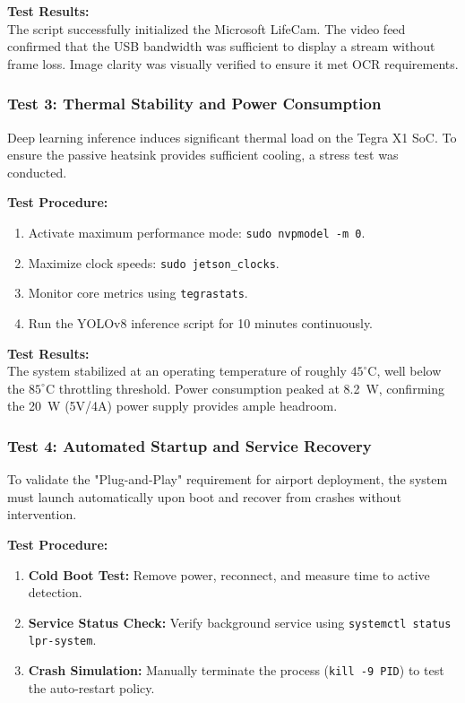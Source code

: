\textbf{Test Results:} \\
The script successfully initialized the Microsoft LifeCam. The video feed confirmed that the USB bandwidth was sufficient to display a stream without frame loss. Image clarity was visually verified to ensure it met OCR requirements.

\subsubsection{Test 3: Thermal Stability and Power Consumption}

Deep learning inference induces significant thermal load on the Tegra X1 SoC. To ensure the passive heatsink provides sufficient cooling, a stress test was conducted.

\textbf{Test Procedure:}
\begin{enumerate}
	\item Activate maximum performance mode: \texttt{sudo nvpmodel -m 0}.
	\item Maximize clock speeds: \texttt{sudo jetson\_clocks}.
	\item Monitor core metrics using \texttt{tegrastats}.
	\item Run the YOLOv8 inference script for 10 minutes continuously.
\end{enumerate}

\textbf{Test Results:} \\
The system stabilized at an operating temperature of roughly $45^\circ$C, well below the $85^\circ$C throttling threshold. Power consumption peaked at \SI{8.2}{\watt}, confirming the \SI{20}{\watt} (5V/4A) power supply provides ample headroom.

\subsubsection{Test 4: Automated Startup and Service Recovery}

To validate the "Plug-and-Play" requirement for airport deployment, the system must launch automatically upon boot and recover from crashes without intervention.

\textbf{Test Procedure:}
\begin{enumerate}
	\item \textbf{Cold Boot Test:} Remove power, reconnect, and measure time to active detection.
	\item \textbf{Service Status Check:} Verify background service using \texttt{systemctl status lpr-system}.
	\item \textbf{Crash Simulation:} Manually terminate the process (\texttt{kill -9 PID}) to test the auto-restart policy.
\end{enumerate}

